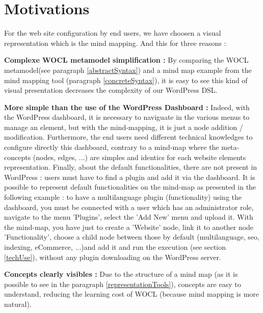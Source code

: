 \section{Motivations}\label{mindMappingUse}
	For the web site configuration by end users, we have choosen a visual representation
	which is the mind mapping. And this for three reasons :
	
	\textbf{Complexe WOCL metamodel simplification :} By comparing
	the WOCL metamodel(see paragraph \ref{abstractSyntax}) and a mind map example from the mind mapping tool (paragraph \ref{concreteSyntax}), it is easy to see this kind of visual presentation decreases the complexity of 	our WordPress DSL.
		
	\textbf{More simple than the use of the WordPress Dashboard :} Indeed, with the WordPress dashboard, it is necessary to naviguate in the various menus to manage an element, but with the mind-mapping, it is just a node addition / modification. Furthermore, the end users need different technical knowledges to  configure directly this dashboard, contrary to a mind-map where the meta-concepts (nodes, edges, ...) are simples and identics for each website elements representation. Finally, about the default functionalities, there are not present in WordPress : users must have to find a plugin and add it via the dashboard. It is possible to represent default functionalities on the mind-map as presented in the following example : to have a multilanguage plugin (functionality) using the dashboard, you must be connected with a user which has an administrator role, navigate to the menu 'Plugins', select the 'Add New' menu and upload it. With the mind-map, you have just to create a 'Website' node, link it to another node 'Functionality', choose a child node between those by default (multilanguage, seo, indexing, eCommerce, ...)and add it and run the execution (see section \ref{techUse}), without any plugin downloading on the WordPress server.
	
	\textbf{Concepts clearly visibles :} Due to the structure of a mind map (as it is possible to see in the paragraph \ref{representationTools}), concepts are easy to understand, reducing the learning cost of WOCL (because mind mapping is more natural\cite{mindMapping}).		